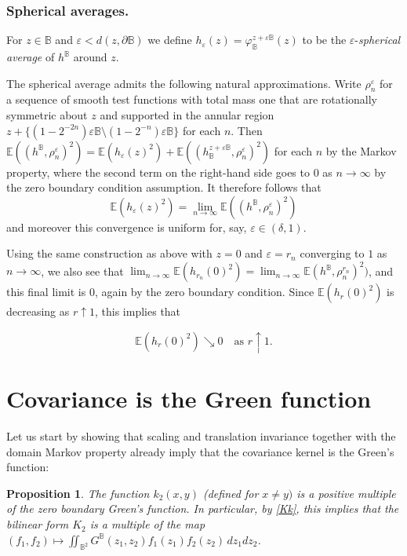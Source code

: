 \documentclass[10pt]{amsart}
\newtheorem{prop}[theorem]{Proposition}
\theoremstyle{definition}
\newcommand{\E}{\mathbb{E}}
\newcommand{\B}{\mathbb{B}}\let\D\B\let\Ub\B
\let\eps\varepsilon
\begin{document}
\subsubsection*{Spherical averages.}
For $z\in \B$ and $\eps<d(z,\partial \B)$ we define $h_\eps(z)=\varphi_\B^{z+\eps\B}(z)$ to be the $\eps$-\emph{spherical average} of $h^\B$ around $z$.
{
The spherical average admits the following natural approximations. Write $\rho_n^{\eps}$ for a sequence of smooth test functions with total mass one that are rotationally symmetric about $z$ and supported in the annular region $z+\{(1-2^{-2n})\eps\B\setminus (1-2^{-n})\eps\B\}$ for each $n$. Then $\E((h^\B,\rho_n^{\eps})^2)=\E(h_\eps(z)^2)+\E((h_\B^{z+\eps\B},\rho_n^{\eps})^2)$ for each $n$ by the Markov property, where the second term on the right-hand side goes to $0$ as $n\to \infty$ by the zero boundary condition assumption. It therefore follows that
\[
\E(h_\eps(z)^2)=\lim_{n\to \infty} \E((h^\B,\rho_n^{\eps})^2)
\]
and moreover this convergence is uniform for, say, $\eps \in (\delta,1)$.

Using the same construction as above with $z=0$ and $\eps=r_n$ converging to $1$ as $n\to\infty$, we also see that $\lim_{n\to \infty} \E(h_{r_n}(0)^2)=\lim_{n\to \infty} \E(h^\B,\rho_n^{r_n})^2)$, and this final limit is $0$, again by the zero boundary condition. Since $\E(h_r(0)^2)$ is decreasing as $r\uparrow 1$, this implies that}\vspace*{-3pt}\enlargethispage{\baselineskip}%
\begin{equation}\label{eq:circav0bc}
\E(h_r(0)^2)\searrow 0 \quad\text{as } r\uparrow 1.
\end{equation}

\section{Covariance is the Green function}\label{sec:cov}
Let us start by showing that scaling and translation invariance together with the domain Markov property already imply that the covariance kernel is the Green's function:

\begin{prop}\label{lem:cov}
The function $k_2(x,y)$ (defined for $x\ne y)$ is a positive multiple of the zero boundary Green's function. In particular, by \eqref{Kk}, this implies that the bilinear form $K_2$ is a multiple of the map $(f_1,f_2)\mapsto \iint_{\B^2} G^\B(z_1,z_2)f_1(z_1)f_2(z_2) \, dz_1 dz_2$.
\end{prop}
\end{document}
